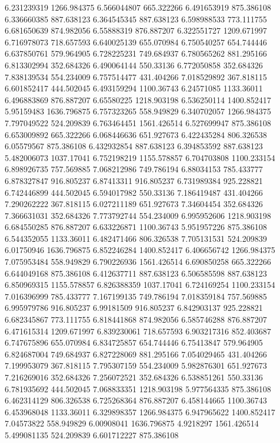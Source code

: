 6.231239319	1266.984375
6.566044807	665.322266
6.491653919	875.386108
6.336660385	887.638123
6.364545345	887.638123
6.598988533	773.111755
6.681650639	874.982056
6.55888319	876.887207
6.322551727	1209.671997
6.716978073	718.657593
6.640025139	655.070984
6.750540257	654.744446
6.637850761	579.964905
6.728225231	749.684937
6.780565262	881.295166
6.813302994	352.684326
6.490064144	550.33136
6.772050858	352.684326
7.838139534	554.234009
6.757514477	431.404266
7.018529892	367.818115
6.601852417	444.502045
6.493159294	1100.36743
6.24571085	1133.36011
6.496883869	876.887207
6.65580225	1218.903198
6.536250114	1400.852417
5.95159483	1636.796875
6.757323265	558.949829
6.340702057	1266.984375
7.797049522	524.209839
6.763464451	1561.426514
6.527699947	875.386108
6.653009892	665.322266
6.068446636	651.927673
6.422435284	806.326538
6.05579567	875.386108
6.432932854	887.638123
6.394853592	887.638123
5.482006073	1037.17041
6.752198219	1155.578857
6.704703808	1100.233154
6.898926735	757.569885
7.068212986	749.786194
6.88034153	785.433777
6.878327847	916.805237
6.87413311	916.805237
6.731989384	925.228821
6.742446899	444.502045
6.594017982	550.33136
7.186419487	431.404266
7.290262222	367.818115
6.027211189	651.927673
7.34604454	352.684326
7.366631031	352.684326
7.773792744	554.234009
6.995952606	1218.903198
6.684550285	876.887207
6.633226871	1100.36743
5.951957226	875.386108
6.544352055	1133.36011
6.482471466	806.326538
7.705131531	524.209839
6.01750946	1636.796875
6.852246284	1400.852417
6.406656742	1266.984375
7.075953484	558.949829
6.790226936	1561.426514
6.690850258	665.322266
6.644049168	875.386108
6.412637711	887.638123
6.506585598	887.638123
6.850969315	1155.578857
6.826388359	1037.17041
6.724169254	1100.233154
7.016396999	785.433777
7.167199135	749.786194
7.018359184	757.569885
6.995979786	916.805237
6.99181509	916.805237
6.842903137	925.228821
6.682345867	773.111755
6.818441868	874.982056
6.585746288	876.887207
6.471615314	1209.671997
6.839230061	718.657593
6.903217316	852.403687
6.747675896	655.070984
6.834725857	654.744446
6.75413847	579.964905
6.824687004	749.684937
6.827228069	881.295166
7.054029465	431.404266
7.199953079	367.818115
7.795307159	554.234009
5.982876301	651.927673
7.216269016	352.684326
7.256072521	352.684326
6.538851261	550.33136
6.781935692	444.502045
7.068833351	1218.903198
5.977564335	875.386108
6.462314129	806.326538
6.725268364	876.887207
6.458144665	1100.36743
6.453968048	1133.36011
6.329898357	1266.984375
6.947965622	1400.852417
7.04573822	558.949829
6.00908041	1636.796875
4.9218297	1561.426514
5.499081135	524.209839
6.601712227	875.386108
